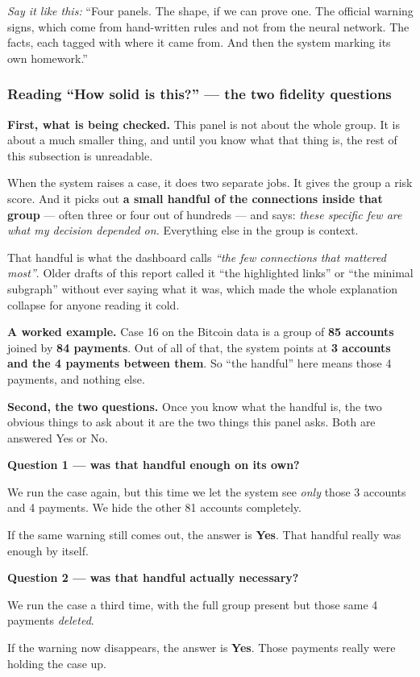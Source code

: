 \documentclass[11pt,a4paper]{article}
\newcommand{\aloud}[1]{\par\smallskip\noindent\textit{\textcolor{accent}{Say
it like this:}} ``#1''\par\smallskip}
\begin{document}
\aloud{Four panels. The shape, if we can prove one. The official warning signs,
which come from hand-written rules and not from the neural network. The facts,
each tagged with where it came from. And then the system marking its own
homework.}

\subsubsection*{Reading ``How solid is this?'' --- the two fidelity questions}

\textbf{First, what is being checked.} This panel is not about the whole group.
It is about a much smaller thing, and until you know what that thing is, the
rest of this subsection is unreadable.

When the system raises a case, it does two separate jobs. It gives the group a
risk score. And it picks out \textbf{a small handful of the connections inside
that group} --- often three or four out of hundreds --- and says: \emph{these
specific few are what my decision depended on.} Everything else in the group is
context.

That handful is what the dashboard calls \emph{``the few connections that
mattered most''}. Older drafts of this report called it ``the highlighted
links'' or ``the minimal subgraph'' without ever saying what it was, which made
the whole explanation collapse for anyone reading it cold.

\begin{plain}
\textbf{A worked example.} Case 16 on the Bitcoin data is a group of
\textbf{85 accounts} joined by \textbf{84 payments}. Out of all of that, the
system points at \textbf{3 accounts and the 4 payments between them}. So
``the handful'' here means those 4 payments, and nothing else.
\end{plain}

\textbf{Second, the two questions.} Once you know what the handful is, the two
obvious things to ask about it are the two things this panel asks. Both are
answered Yes or No.

\begin{plain}
\textbf{Question 1 --- was that handful enough on its own?}

We run the case again, but this time we let the system see \emph{only} those
3 accounts and 4 payments. We hide the other 81 accounts completely.

If the same warning still comes out, the answer is \textbf{Yes}. That handful
really was enough by itself.

\vspace{6pt}
\textbf{Question 2 --- was that handful actually necessary?}

We run the case a third time, with the full group present but those same
4 payments \emph{deleted}.

If the warning now disappears, the answer is \textbf{Yes}. Those payments
really were holding the case up.
\end{plain}
\end{document}
